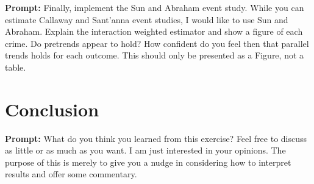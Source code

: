 \documentclass{article}
\begin{document}
	\textbf{Prompt: } Finally, implement the Sun and Abraham event study.  While you can estimate Callaway and Sant’anna event studies, I would like to use Sun and Abraham.  Explain the interaction weighted estimator and show a figure of each crime.  Do pretrends appear to hold?  How confident do you feel then that parallel trends holds for each outcome.  This should only be presented as a Figure, not a table.  

\section{Conclusion}

\textbf{Prompt: }What do you think you learned from this exercise?  Feel free to discuss as little or as much as you want.  I am just interested in your opinions.  The purpose of this is merely to give you a nudge in considering how to interpret results and offer some commentary. 
\end{document}
